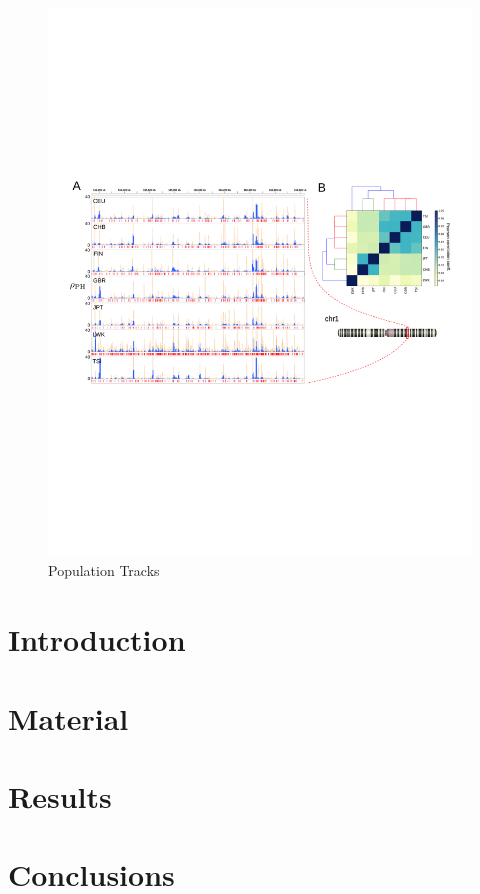\begin{figure}
\centering
\includegraphics[width=\textwidth]{./fig/human_rates_Fig3.pdf}
\caption{Population Tracks}
\label{human_rates:fig:fig2}
\end{figure}

\section{Introduction}

\section{Material}

\section{Results}

\section{Conclusions}